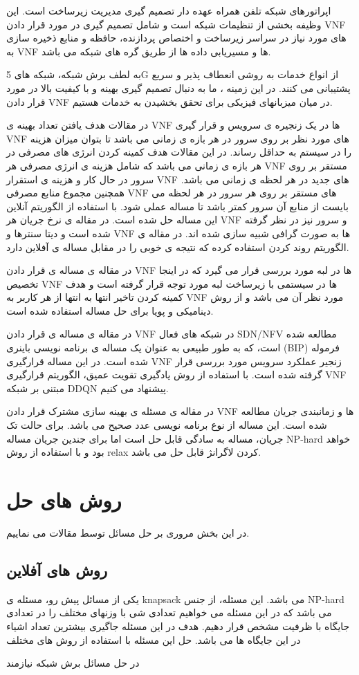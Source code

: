 اپراتورهای شبکه تلفن همراه عهده دار تصمیم گیری مدیریت زیرساخت است.
این وظیفه بخشی از تنظیمات شبکه است و شامل تصمیم گیری در مورد قرار دادن VNF های مورد نیاز در سراسر زیرساخت و اختصاص پردازنده، حافظه و منابع ذخیره سازی به VNF ها و مسیریابی داده ها از طریق گره های شبکه
می باشد.

به لطف برش شبکه، شبکه های 5G از انواع خدمات به روشی انعطاف پذیر و سریع پشتیبانی می کنند. در این زمینه ، ما به دنبال تصمیم گیری بهینه و با کیفیت بالا در مورد قرار دادن VNF در میان میزبانهای فیزیکی برای تحقق بخشیدن به خدمات هستیم.

در مقالات
\cite{wang2016online,jia2018online,luo2020online}
هدف یافتن تعداد بهینه ی VNF ها در یک زنجیره ی سرویس و قرار گیری VNF های مورد نظر بر روی سرور در هر بازه ی زمانی می باشد تا بتوان میزان هزینه را در سیستم به حداقل رساند.
در این مقالات هدف کمینه کردن انرژی های مصرفی در هر بازه ی زمانی می باشد که شامل هزینه ی انرژی مصرفی هر VNF مستقر بر روی سرور در حال کار و هزینه ی استقرار VNF های جدید در هر لحظه ی زمانی می باشد.
همچنین مجموع منابع مصرفی VNF های مستقر بر روی هر سرور در هر لحظه می بایست از منابع آن سرور کمتر باشد تا مساله عملی شود.
با استفاده از الگوریتم آنلاین این مساله حل شده است.
در مقاله ی 
\cite{jia2018online,luo2020online}
نرخ جریان هر VNF و سرور نیز در نظر گرفته شده است و دیتا سنترها و VNF ها به صورت گرافی شبیه سازی شده اند.
در مقاله ی
\cite{luo2020online}
الگوریتم روند کردن استفاده کرده که نتیجه ی خوبی را در مقابل مساله ی آفلاین دارد.

در مقاله ی
\cite{cziva2018dynamic}
مساله ی قرار دادن VNF ها در لبه مورد بررسی قرار می گیرد که در اینجا تخصیص VNF ها در سیستمی با زیرساخت لبه مورد توجه قرار گرفته است و هدف کمینه کردن تاخیر انتها به انتها از هر کاربر به VNF مورد نظر آن می باشد و از روش دینامیکی و پویا برای حل مساله استفاده شده است. 

در مقاله ی
\cite{pei2019optimal}
مساله ی قرار دادن VNF در شبکه های فعال SDN/NFV مطالعه شده است، که به طور طبیعی به عنوان یک مساله ی برنامه نویسی باینری (BIP) فرموله شده است. 
در این مساله قرارگیری VNF زنجیر عملکرد سرویس مورد بررسی قرار گرفته شده است. 
با استفاده از روش یادگیری تقویت عمیق، الگوریتم قرارگیری VNF مبتنی بر شبکه DDQN  پیشنهاد می کنیم.

در مقاله ی
\cite{ren2020joint}
 مسئله ی بهینه سازی مشترک قرار دادن VNF ها و زمانبندی جریان مطالعه شده است.
 این مساله از نوع برنامه نویسی عدد صحیح می باشد.
 برای حالت تک جریان، مساله به سادگی قابل حل است اما برای جندین جریان مساله
 NP-hard
 خواهد بود و با استفاده از روش relax کردن لاگرانژ
 قابل حل می باشد.
\section{روش های حل}
در این بخش مروری بر حل مسائل توسط مقالات می نماییم.
\subsection{روش های آفلاین}
یکی از مسائل پیش رو، مسئله ی knapsack
می باشد.
این مسئله، از جنس NP-hard
می باشد که در این مسئله می خواهیم تعدادی شی با وزنهای مختلف را در تعدادی جایگاه با ظرفیت مشخص قرار دهیم.
هدف در این مسئله جاگیری بیشترین تعداد اشیاء در این جایگاه ها می باشد.
حل این مسئله با استفاده از روش های مختلف 

در حل مسائل برش شبکه نیازمند 
\cite{li2020end} 